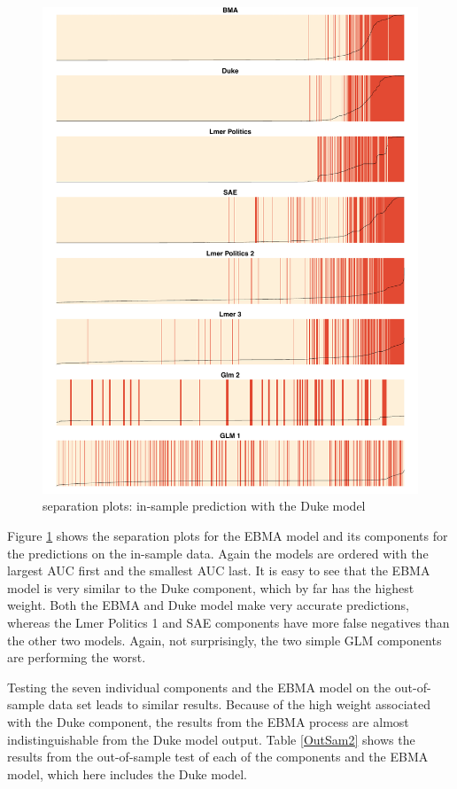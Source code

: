 \documentclass[pdftex,12pt,fullpage,oneside]{amsart}
\begin{document}
\begin{figure}[ht!]
\caption{separation plots: in-sample prediction with the Duke
model}
\label{InSam2sep}
\includegraphics[width=6.2 in]{Plots_Insample}
\end{figure}

Figure \ref{InSam2sep} shows the separation plots for the EBMA model
and its components for the predictions on the in-sample data. Again
the models are ordered with the largest AUC first and the smallest AUC
last. It is easy to see that the EBMA model is very similar to the Duke
component, which by far has the highest weight. Both the EBMA and Duke
model make very accurate predictions, whereas the Lmer Politics 1 and
SAE components have more false negatives than the other two models. Again,
not surprisingly, the two simple GLM components are performing the worst.

Testing the seven individual components and the EBMA model on the
out-of-sample data set leads to similar results. Because of the high
weight associated with the Duke component, the results from the EBMA process are
almost indistinguishable from the Duke model output. Table \ref{OutSam2}
shows the results from the out-of-sample test of each of the components
and the EBMA model, which here includes the Duke model.
\end{document}
